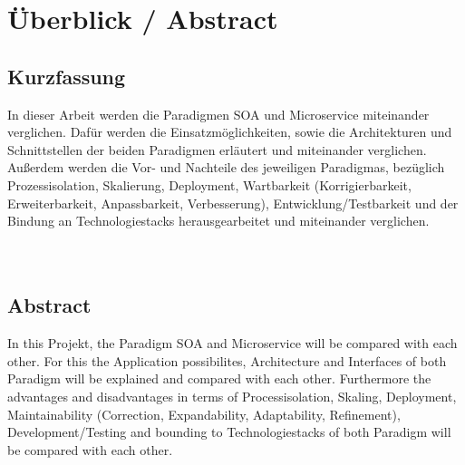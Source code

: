 \chapter*{Überblick / Abstract}
\section*{Kurzfassung}
In dieser Arbeit werden die Paradigmen SOA und Microservice miteinander verglichen. Dafür werden die Einsatzmöglichkeiten, sowie die Architekturen und Schnittstellen der beiden Paradigmen erläutert und miteinander verglichen. Außerdem werden die Vor- und Nachteile des jeweiligen Paradigmas, bezüglich Prozessisolation, Skalierung, Deployment, Wartbarkeit (Korrigierbarkeit, Erweiterbarkeit, Anpassbarkeit, Verbesserung), Entwicklung/Testbarkeit und der Bindung an Technologiestacks herausgearbeitet und miteinander verglichen. 
\\\\\\
\section*{Abstract}
In this Projekt, the Paradigm SOA and Microservice will be compared with each other. For this the Application possibilites, Architecture and Interfaces of both Paradigm will be explained and compared with each other. Furthermore the advantages and disadvantages in terms of Processisolation, Skaling, Deployment, Maintainability (Correction, Expandability, Adaptability, Refinement), Development/Testing and bounding to Technologiestacks of both Paradigm will be compared with each other.